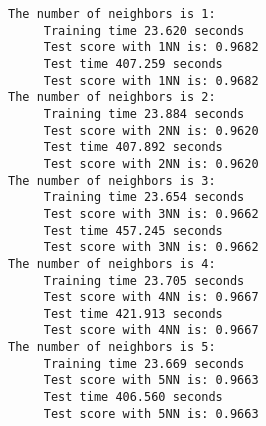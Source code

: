 \documentclass[11pt]{article}
\begin{document}
    \begin{Verbatim}[commandchars=\\\{\}]
The number of neighbors is 1: 
     Training time 23.620 seconds
     Test score with 1NN is: 0.9682
     Test time 407.259 seconds
     Test score with 1NN is: 0.9682
The number of neighbors is 2: 
     Training time 23.884 seconds
     Test score with 2NN is: 0.9620
     Test time 407.892 seconds
     Test score with 2NN is: 0.9620
The number of neighbors is 3: 
     Training time 23.654 seconds
     Test score with 3NN is: 0.9662
     Test time 457.245 seconds
     Test score with 3NN is: 0.9662
The number of neighbors is 4: 
     Training time 23.705 seconds
     Test score with 4NN is: 0.9667
     Test time 421.913 seconds
     Test score with 4NN is: 0.9667
The number of neighbors is 5: 
     Training time 23.669 seconds
     Test score with 5NN is: 0.9663
     Test time 406.560 seconds
     Test score with 5NN is: 0.9663

    \end{Verbatim}
\end{document}
